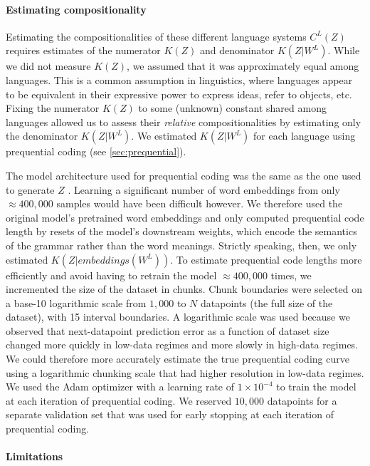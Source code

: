 \documentclass{article}
\begin{document}
\begin{appendices}
\paragraph{Estimating compositionality}

Estimating the compositionalities of these different language systems $C^L(Z)$ requires estimates of the numerator $K(Z)$ and denominator $K(Z|W^L)$. While we did not measure $K(Z)$, we assumed that it was approximately equal among languages. This is a common assumption in linguistics, where languages appear to be equivalent in their expressive power to express ideas, refer to objects, etc. Fixing the numerator $K(Z)$ to some (unknown) constant shared among languages allowed us to assess their \emph{relative} compositionalities by estimating only the denominator $K(Z|W^L)$. We estimated $K(Z|W^L)$ for each language using prequential coding (see \cref{sec:prequential}).

The model architecture used for prequential coding was the same as the one used to generate $Z$ \citep{reimers-2020-multilingual-sentence-bert}. Learning a significant number of word embeddings from only $\approx 400,000$ samples would have been difficult however. We therefore used the original model's pretrained word embeddings and only computed prequential code length by resets of the model's downstream weights, which encode the semantics of the grammar rather than the word meanings. Strictly speaking, then, we only estimated $K(Z|embeddings(W^L))$. To estimate prequential code lengths more efficiently and avoid having to retrain the model $\approx 400,000$ times, we incremented the size of the dataset in chunks. Chunk boundaries were selected on a base-10 logarithmic scale from $1,000$ to $N$ datapoints (the full size of the dataset), with 15 interval boundaries. A logarithmic scale was used because we observed that next-datapoint prediction error as a function of dataset size changed more quickly in low-data regimes and more slowly in high-data regimes. We could therefore more accurately estimate the true prequential coding curve using a logarithmic chunking scale that had higher resolution in low-data regimes. We used the Adam optimizer with a learning rate of $1 \times 10^{-4}$ to train the model at each iteration of prequential coding. We reserved $10,000$ datapoints for a separate validation set that was used for early stopping at each iteration of prequential coding.

\paragraph{Limitations}


\end{appendices}
\end{document}

